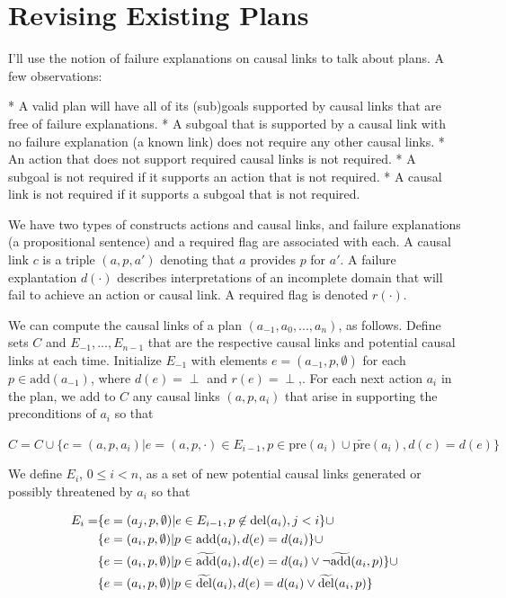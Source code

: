 \documentclass{article}
\begin{document}
\section{Revising Existing Plans}

I'll use the notion of failure explanations on causal links to talk about plans.  A few observations:


* A valid plan will have all of its (sub)goals supported by causal links that are free of failure explanations.  
* A subgoal that is supported by a causal link with no failure explanation (a known link) does not require any other causal links.
* An action that does not support required causal links is not required.
* A subgoal is not required if it supports an action that is not required.
* A causal link is not required if it supports a subgoal that is not required.

We have two types of constructs actions and causal links, and failure explanations (a propositional sentence) and a required flag are associated with each.  A causal link $c$ is a triple $(a, p, a')$ denoting that $a$ provides $p$ for $a'$.  A failure explantation $d(\cdot)$ describes interpretations of an incomplete domain that will fail to achieve an action or  causal link.  A required flag is denoted $r(\cdot)$.

We can compute the causal links of a plan $(a_{-1}, a_0, ..., a_n)$, as follows.  Define sets $C$ and $E_{-1}, ..., E_{n-1}$ that are the respective causal links and potential causal links at each time.  Initialize $E_{-1}$ with elements $e = (a_{-1}, p, \emptyset)$  for each $p \in \text{add}(a_{-1})$, where $d(e) = \perp$ and $r(e) = \perp$,.  For each next action $a_i$ in the plan, we add to $C$ any causal links $(a, p, a_i)$ that arise in supporting the preconditions of $a_i$ so that

$C = C \cup \{ c = (a, p, a_i) | e = (a, p, \cdot) \in E_{i-1}, p \in \text{pre}(a_i) \cup \widetilde{\text{pre}}(a_i), d(c) = d(e)\} $

We define $E_i$, $0 \leq i < n$, as a set of new potential causal links generated or possibly threatened by $a_i$  so that 

\begin{align}
E_i = 
&\{e = (a_j, p, \emptyset) | e \in E_{i-1}, p \not\in{\text{del}}(a_i), j < i\} \cup \notag \\ %
&\{e = (a_i, p, \emptyset) | p \in \text{add}(a_i), d(e) = d(a_i)\} \cup \notag \\ %
&\{e = (a_i, p, \emptyset) | p \in \widetilde{\text{add}}(a_i), d(e) = d(a_i) \vee \neg\widetilde{\text{add}}(a_i, p) \} \cup \notag \\ %
& \{e = (a_i, p, \emptyset) | p \in \widetilde{\text{del}}(a_i), d(e) = d(a_i) \vee \widetilde{\text{del}}(a_i, p)  \}\notag %
\end{align}
\end{document}
